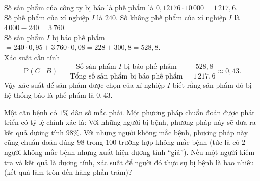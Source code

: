 \begin{bt}
{		Số sản phẩm của công  ty bị báo là phế phẩm là $0{,}12176\cdot 10\,000=1\,217{,}6$. \\
		Số phế  phẩm của xí nghiệp $I$ là $240$. Số không phế phẩm của xí nghiệp $I$ là $4\,000-240=3\,760$. \\
		Số sản phẩm $I$ bị báo phế phẩm $= 240\cdot 0{,}95 + 3\,760\cdot  0{,}08 = 228+300{,}8=528{,}8$. \\
		Xác suất cần tính $$\mathrm{P}\left(C\mid  B\right)=\dfrac{\text{ Số sản phẩm } I \text{ bị báo phế phẩm}}{\text{ Tổng số sản phẩm bị báo phế phẩm}}=\dfrac{528{,}8}{1\,217{,}6}\approx 0{,}43.$$
		Vậy xác suất  để sản phẩm được chọn của xí nghiệp $I$ biết rằng sản phẩm đó bị hệ thống báo là phế phẩm là $0{,}43$.
	} 
\end{bt}

\begin{bt}%
	Một căn bệnh có $1\%$ dân số mắc phải. Một phương pháp chuẩn đoán được phát triển có tỷ lệ chính xác là: Với những người bị bệnh, phương pháp này sẽ đưa ra kết quả dương tính $98\%$. Với những người không mắc bệnh, phương pháp này cũng chuẩn đoán đúng $98$ trong $100$ trường hợp không mắc bệnh (tức là có $2$ người không mắc bệnh nhưng xuất hiện  dương tính “giả”). Nếu một người kiểm tra và kết quả là dương tính, xác suất để người đó thực sự bị bệnh là bao nhiêu (kết quả làm tròn đến hàng phần trăm)?
\end{bt}

